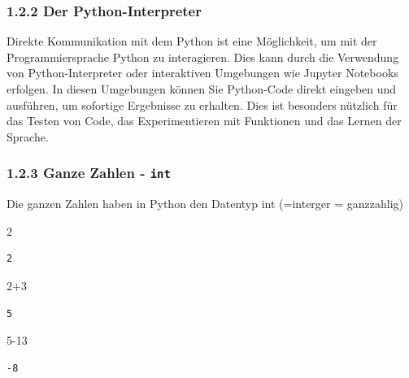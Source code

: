 \documentclass[
  11pt,
  a4paper,
  DIV=11,
  numbers=noendperiod]{scrartcl}
\newenvironment{Shaded}{\begin{snugshade}}{\end{snugshade}}
\newcommand{\DecValTok}[1]{\textcolor[rgb]{0.68,0.00,0.00}{#1}}
\newcommand{\OperatorTok}[1]{\textcolor[rgb]{0.37,0.37,0.37}{#1}}
\begin{document}
\subsubsection{1.2.2 Der
Python-Interpreter}\label{der-python-interpreter}

Direkte Kommunikation mit dem Python ist eine Möglichkeit, um mit der
Programmiersprache Python zu interagieren. Dies kann durch die
Verwendung von Python-Interpreter oder interaktiven Umgebungen wie
Jupyter Notebooks erfolgen. In diesen Umgebungen können Sie Python-Code
direkt eingeben und ausführen, um sofortige Ergebnisse zu erhalten. Dies
ist besonders nützlich für das Testen von Code, das Experimentieren mit
Funktionen und das Lernen der Sprache.

\subsubsection{\texorpdfstring{1.2.3 Ganze Zahlen -
\texttt{int}}{1.2.3 Ganze Zahlen - int}}\label{ganze-zahlen---int}

Die ganzen Zahlen haben in Python den Datentyp int (=interger =
ganzzahlig)

\begin{Shaded}
\begin{Highlighting}[numbers=left,,]
\DecValTok{2}
\end{Highlighting}
\end{Shaded}

\begin{verbatim}
2
\end{verbatim}

\begin{Shaded}
\begin{Highlighting}[numbers=left,,]
\DecValTok{2}\OperatorTok{+}\DecValTok{3}
\end{Highlighting}
\end{Shaded}

\begin{verbatim}
5
\end{verbatim}

\begin{Shaded}
\begin{Highlighting}[numbers=left,,]
\DecValTok{5}\OperatorTok{{-}}\DecValTok{13}
\end{Highlighting}
\end{Shaded}

\begin{verbatim}
-8
\end{verbatim}
\end{document}

